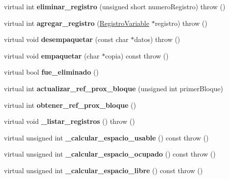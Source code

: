 \begin{DoxyCompactItemize}
\item 
\hypertarget{class_bloque_afd76a7a09070f6635bf2d03b1cf8d273}{virtual int {\bfseries eliminar\-\_\-registro} (unsigned short numero\-Registro)  throw ()}\label{class_bloque_afd76a7a09070f6635bf2d03b1cf8d273}

\item 
\hypertarget{class_bloque_a883935436c145ec80b3602a6b356e65b}{virtual int {\bfseries agregar\-\_\-registro} (\hyperlink{class_registro_variable}{\-Registro\-Variable} $\ast$registro)  throw ()}\label{class_bloque_a883935436c145ec80b3602a6b356e65b}

\item 
\hypertarget{class_bloque_aa9dd93f041c097d253523e7d75f0b4e2}{virtual void {\bfseries desempaquetar} (const char $\ast$datos)  throw ()}\label{class_bloque_aa9dd93f041c097d253523e7d75f0b4e2}

\item 
\hypertarget{class_bloque_abfe9430b18f91173b8ff5eef0d2d0c96}{virtual void {\bfseries empaquetar} (char $\ast$copia) const   throw ()}\label{class_bloque_abfe9430b18f91173b8ff5eef0d2d0c96}

\item 
\hypertarget{class_bloque_a4aeed65a37b89568202bf010328ab837}{virtual bool {\bfseries fue\-\_\-eliminado} ()}\label{class_bloque_a4aeed65a37b89568202bf010328ab837}

\item 
\hypertarget{class_bloque_a48b983598ae40302054c33e8ef1fd3f7}{virtual int {\bfseries actualizar\-\_\-ref\-\_\-prox\-\_\-bloque} (unsigned int primer\-Bloque)}\label{class_bloque_a48b983598ae40302054c33e8ef1fd3f7}

\item 
\hypertarget{class_bloque_a892beba312fb9ad485b39a56f7aff381}{virtual int {\bfseries obtener\-\_\-ref\-\_\-prox\-\_\-bloque} ()}\label{class_bloque_a892beba312fb9ad485b39a56f7aff381}

\item 
\hypertarget{class_bloque_a7054b8e9fd362377d051505a7e11f3c4}{virtual void {\bfseries \-\_\-listar\-\_\-registros} ()  throw ()}\label{class_bloque_a7054b8e9fd362377d051505a7e11f3c4}

\item 
\hypertarget{class_bloque_a542305bb474295fd5de4951d4681413f}{virtual unsigned int {\bfseries \-\_\-calcular\-\_\-espacio\-\_\-usable} () const   throw ()}\label{class_bloque_a542305bb474295fd5de4951d4681413f}

\item 
\hypertarget{class_bloque_a9e1ad57b71135105e4609e85a87760b7}{virtual unsigned int {\bfseries \-\_\-calcular\-\_\-espacio\-\_\-ocupado} () const   throw ()}\label{class_bloque_a9e1ad57b71135105e4609e85a87760b7}

\item 
\hypertarget{class_bloque_ac2e0718b1f379f21e65dfa8fc9658b55}{virtual unsigned int {\bfseries \-\_\-calcular\-\_\-espacio\-\_\-libre} () const   throw ()}\label{class_bloque_ac2e0718b1f379f21e65dfa8fc9658b55}

\end{DoxyCompactItemize}
